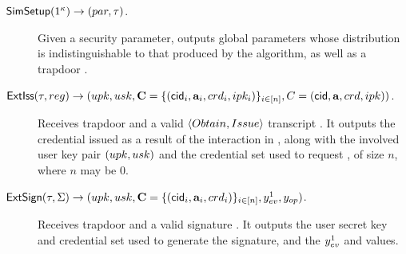 \begin{description}
\item[$\mathsf{SimSetup}(1^\kappa) \rightarrow (par,\tau)$.] Given a security
  parameter, outputs global parameters \parm whose distribution is
  indistinguishable to that produced by the \Setup algorithm, as well as a
  trapdoor \trap.
\item[$\mathsf{ExtIss}(\tau,reg) \rightarrow (upk,usk,\mathbf{C}=
  \lbrace(\mathsf{cid}_i,\mathbf{a}_i,crd_i,ipk_i) \rbrace_{i \in [n]},
  C=(\mathsf{cid},\mathbf{a},crd,ipk))$.]
  Receives trapdoor \trap and a valid $\langle Obtain, Issue \rangle$
  transcript \utrans. It outputs the credential \Cred issued as a result of the
  interaction in \utrans, along with the involved user key pair $(upk,usk)$
  and the credential set \sCred used to request \Cred, of size $n$, where $n$
  may be $0$.
\item[$\mathsf{ExtSign}(\tau,\Sigma) \rightarrow
  (upk,usk,\mathbf{C}=\lbrace(\mathsf{cid}_i,\mathbf{a}_i,crd_i)
  \rbrace_{i \in [n]},y_{ev}^1,y_{op})$.] Receives trapdoor \trap and a valid
  signature \Sig. It outputs the user secret key and credential set \sCred used
  to generate the signature, and the $y_{ev}^1$ and \yinsp values. 



\end{description}
